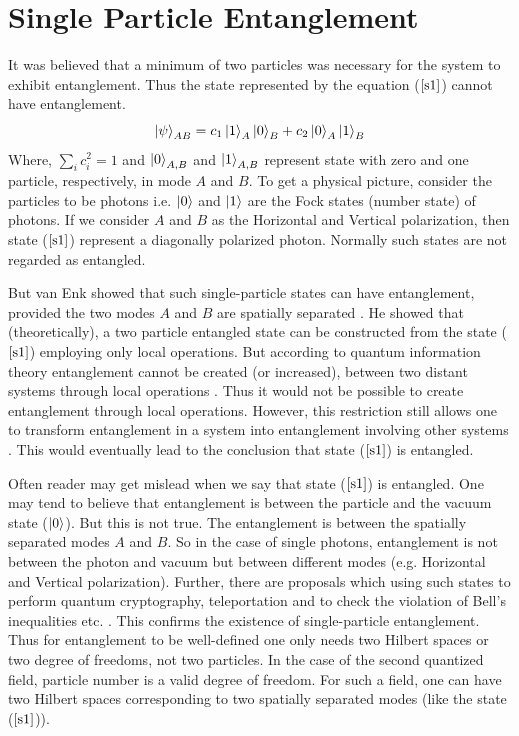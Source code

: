 \documentclass[12pt,a4paper]{report}
\begin{document}
\section{Single Particle Entanglement}
It was believed that a minimum of two particles was necessary for the system to exhibit entanglement. Thus the state represented by the equation ($\ref{s1}$) cannot have entanglement.
\begin{equation}
\label{s1}
\ket{\psi}_{AB} = c_{1}\ket{1}_{A}\ket{0}_{B} + c_{2}\ket{0}_{A}\ket{1}_{B}
\end{equation}
Where, $\sum_{i}c_{i}^{2} = 1$ and $\ket{0}_{A,B}$ and $\ket{1}_{A,B}$  represent state with zero and one particle, respectively, in mode $A$ and $B$. To get a physical picture, consider the particles to be photons i.e. $\ket{0}$ and $\ket{1}$ are the Fock states (number state) of photons. If we consider $A$ and $B$ as the Horizontal and Vertical polarization, then state ($\ref{s1}$) represent a diagonally polarized photon. Normally such states are not regarded as entangled.\par
But van Enk showed that such single-particle states can have entanglement, provided the two modes $A$ and $B$ are spatially separated \cite{vanenk2005}. He showed that (theoretically), a two particle entangled state can be constructed from the state ($\ref{s1}$) employing only local operations. But according to quantum information theory entanglement cannot be created (or increased), between two distant systems  through local operations \cite{bennet96}\cite{bennet96b}. Thus it would not be possible to create entanglement through local operations. However, this restriction still allows one to transform entanglement in a system into entanglement involving other systems \cite{popsecu97}. This would eventually lead to the conclusion that state ($\ref{s1}$) is entangled.\par

Often reader may get mislead when we say that state ($\ref{s1}$) is entangled. One may tend to believe that entanglement is between the particle and the vacuum state ($\ket{0}$). But this is not true. The entanglement is between the spatially separated modes $A$  and $B$. So in the case of single photons, entanglement is not between the photon and vacuum but between different modes (e.g. Horizontal and Vertical polarization). Further, there are proposals which using such states to perform quantum cryptography, teleportation and to check the violation of Bell’s inequalities etc. \cite{lee}\cite{lombardi}\cite{hessmo}. This confirms the existence of single-particle entanglement. Thus for entanglement to be well-defined one only needs two Hilbert spaces or two degree of freedoms, not two particles. In the case of the second quantized field, particle number is a valid degree of freedom. For such a field, one can have two Hilbert spaces corresponding to two spatially separated modes (like the state ($\ref{s1}$)).
\end{document}
